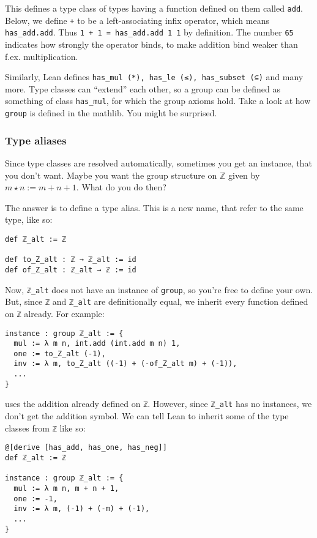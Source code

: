\documentclass[a4paper, 12pt]{article}
\newcommand{\Z}{\mathbb{Z}}
\newcommand{\lean}[1]{\texttt{#1}}
\theoremstyle{changedot}
\theoremstyle{changedotbreak}
\theoremstyle{nonumberplain}
\begin{document}
This defines a type class of types having a function defined on them called \lean{add}. Below, we define \lean{+} to be a left-associating infix operator, which means \lean{has_add.add}. Thus \lean{1 + 1 = has_add.add 1 1} by definition. The number \lean{65} indicates how strongly the operator binds, to make addition bind weaker than f.ex. multiplication.

Similarly, Lean defines \lean{has_mul (*), has_le (≤), has_subset (⊆)} and many more. Type classes can ``extend'' each other, so a group can be defined as something of class \lean{has_mul}, for which the group axioms hold. Take a look at how \lean{group} is defined in the mathlib. You might be surprised.

\subsubsection{Type aliases}\label{sss:typealias}
Since type classes are resolved automatically, sometimes you get an instance, that you don't want. Maybe you want the group structure on $\Z$ given by $m \star n := m + n + 1$. What do you do then?

The answer is to define a type alias. This is a new name, that refer to the same type, like so:

\begin{verbatim}
def ℤ_alt := ℤ

def to_Z_alt : ℤ → ℤ_alt := id
def of_Z_alt : ℤ_alt → ℤ := id
\end{verbatim}

Now, \lean{ℤ_alt} does not have an instance of \lean{group}, so you're free to define your own. But, since \lean{ℤ} and \lean{ℤ_alt} are definitionally equal, we inherit every function defined on \lean{ℤ} already. For example:

\begin{verbatim}
instance : group ℤ_alt := {
  mul := λ m n, int.add (int.add m n) 1,
  one := to_Z_alt (-1),
  inv := λ m, to_Z_alt ((-1) + (-of_Z_alt m) + (-1)),
  ...
}
\end{verbatim}

uses the addition already defined on \lean{ℤ}. However, since \lean{ℤ_alt} has no instances, we don't get the addition symbol. We can tell Lean to inherit some of the type classes from \lean{ℤ} like so:

\begin{verbatim}
@[derive [has_add, has_one, has_neg]]
def ℤ_alt := ℤ

instance : group ℤ_alt := {
  mul := λ m n, m + n + 1,
  one := -1,
  inv := λ m, (-1) + (-m) + (-1),
  ...
}
\end{verbatim}
\end{document}

